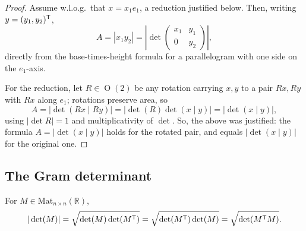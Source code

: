 \begin{proof}
Assume w.l.o.g.\ that $x = x_1e_1$, a reduction justified below. Then, writing
$y = (y_1,y_2)^{\mathsf{T}}$,
\[A = |x_1y_2| = \left|\det\begin{pmatrix} x_1 & y_1 \\ 0 & y_2 \end{pmatrix}\right|,\]
directly from the base-times-height formula for a parallelogram with one side on the
$e_1$-axis.

\begin{center}
\end{center}

For the reduction, let $R \in \operatorname{O}(2)$ be any rotation carrying $x,y$ to a pair
$Rx,Ry$ with $Rx$ along $e_1$; rotations preserve area, so
\[A = \big|\det(Rx\mid Ry)\big| = \big|\det(R)\det(x\mid y)\big| = \big|\det(x\mid y)\big|,\]
using $|\det R| = 1$ and multiplicativity of $\det$. So, the  above was
justified: the formula $A=|\det(x\mid y)|$ holds for the rotated pair, and equals
$|\det(x\mid y)|$ for the original one.
\end{proof}

\subsection{The Gram determinant}
\label{sec:gram_determinant}

\begin{lemma}
\label{lem:gram_determinant_square}
For $M \in \mathrm{Mat}_{n\times n}(\mathbb{R})$,
\[|\det(M)| = \sqrt{\det(M)\det(M^{\mathsf{T}})} = \sqrt{\det(M^{\mathsf{T}})\det(M)}
  = \sqrt{\det(M^{\mathsf{T}} M)}.\]
\end{lemma}

